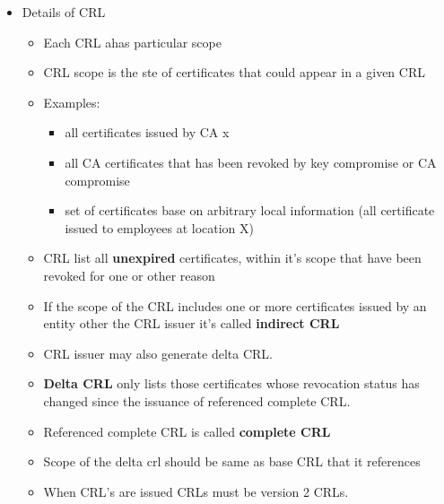 \documentclass[12pt]{report}
\begin{document}
        \begin{itemize}
            \item Details of CRL
            \begin{itemize}
                \item Each CRL ahas particular scope
                \item CRL scope is the ste of certificates that could appear in a given CRL
                \item Examples:
                    \begin{itemize}
                        \item all certificates issued by CA x
                        \item all CA certificates that has been revoked by key compromise or CA compromise
                        \item set of certificates base on arbitrary local information (all certificate issued to employees at location X)
                     \end{itemize}
                \item CRL list all \textbf{unexpired} certificates, within it's scope that have been revoked for one or other reason
                \item If the scope of the CRL includes one or more certificates issued by an entity other the CRL issuer it's called \textbf{indirect CRL}
                \item CRL issuer may also generate delta CRL. 
                \item \textbf{Delta CRL} only lists those certificates whose revocation status has changed since the issuance of referenced complete CRL.
                \item Referenced complete CRL is called \textbf{complete CRL}
                \item Scope of the delta crl should be same as base CRL that it references
                \item When CRL's are issued CRLs must be version 2 CRLs. 
            \end{itemize}
        \end{itemize}
\end{document}
